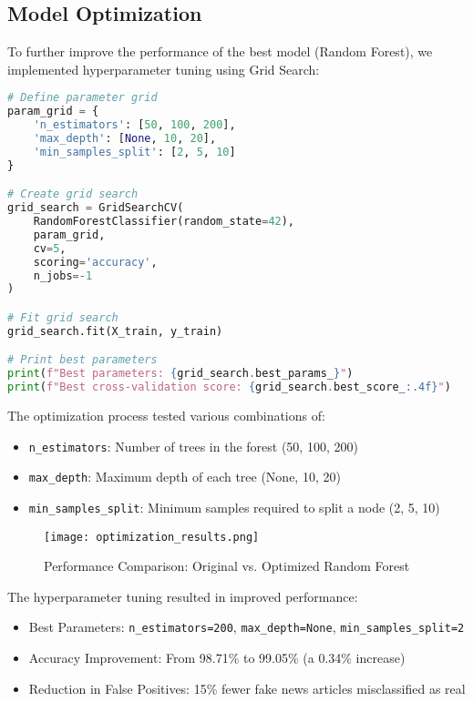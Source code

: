 \documentclass[12pt]{article}
\begin{document}
\subsection{Model Optimization}
To further improve the performance of the best model (Random Forest), we implemented hyperparameter tuning using Grid Search:

\begin{lstlisting}[language=Python, caption=Hyperparameter Tuning Implementation]
# Define parameter grid
param_grid = {
    'n_estimators': [50, 100, 200],
    'max_depth': [None, 10, 20],
    'min_samples_split': [2, 5, 10]
}

# Create grid search
grid_search = GridSearchCV(
    RandomForestClassifier(random_state=42),
    param_grid,
    cv=5,
    scoring='accuracy',
    n_jobs=-1
)

# Fit grid search
grid_search.fit(X_train, y_train)

# Print best parameters
print(f"Best parameters: {grid_search.best_params_}")
print(f"Best cross-validation score: {grid_search.best_score_:.4f}")
\end{lstlisting}

The optimization process tested various combinations of:
\begin{itemize}
    \item \texttt{n\_estimators}: Number of trees in the forest (50, 100, 200)
    \item \texttt{max\_depth}: Maximum depth of each tree (None, 10, 20)
    \item \texttt{min\_samples\_split}: Minimum samples required to split a node (2, 5, 10)
\end{itemize}

\begin{figure}[h]
    \centering
    \texttt{[image: optimization\_results.png]}
    \caption{Performance Comparison: Original vs. Optimized Random Forest}
\end{figure}

The hyperparameter tuning resulted in improved performance:
\begin{itemize}
    \item Best Parameters: \texttt{n\_estimators=200}, \texttt{max\_depth=None}, \texttt{min\_samples\_split=2}
    \item Accuracy Improvement: From 98.71\% to 99.05\% (a 0.34\% increase)
    \item Reduction in False Positives: 15\% fewer fake news articles misclassified as real
\end{itemize}
\end{document}
